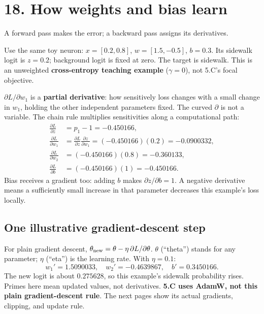 \documentclass[11pt,letterpaper]{article}
\newcommand{\guidepage}[2]{\clearpage\pdfbookmark[0]{#1}{guide-\thepage}\section*{#1}{\sffamily\color{muted}#2}\par\vspace{5pt}}
\begin{document}
\guidepage{18. How weights and bias learn}{A forward pass makes the error; a backward pass assigns its derivatives.}
Use the same toy neuron: $x=[0.2,0.8]$, $w=[1.5,-0.5]$, $b=0.3$. Its sidewalk logit is $z=0.2$; background logit is fixed at zero. The target is sidewalk. This is an unweighted \textbf{cross-entropy teaching example} ($\gamma=0$), not 5.C's focal objective.
\begin{center}
\end{center}
$\partial L/\partial w_1$ is a \textbf{partial derivative}: how sensitively loss changes with a small change in $w_1$, holding the other independent parameters fixed. The curved $\partial$ is not a variable. The chain rule multiplies sensitivities along a computational path:
\begin{align*}
\frac{\partial L}{\partial z}&=p_1-1=-0.450166,\\
\frac{\partial L}{\partial w_1}&=\frac{\partial L}{\partial z}\frac{\partial z}{\partial w_1}
=(-0.450166)(0.2)=-0.0900332,\\
\frac{\partial L}{\partial w_2}&=(-0.450166)(0.8)=-0.360133,\\
\frac{\partial L}{\partial b}&=(-0.450166)(1)=-0.450166.
\end{align*}
Bias receives a gradient too: adding $b$ makes $\partial z/\partial b=1$. A negative derivative means a sufficiently small increase in that parameter decreases this example's loss locally.

\subsection*{One illustrative gradient-descent step}
For plain gradient descent, $\theta_{\rm new}=\theta-\eta\,\partial L/\partial\theta$. $\theta$ (``theta'') stands for any parameter; $\eta$ (``eta'') is the learning rate. With $\eta=0.1$:
\[
w_1'=1.5090033,\quad w_2'=-0.4639867,\quad b'=0.3450166.
\]
The new logit is about $0.275628$, so this example's sidewalk probability rises. Primes here mean updated values, not derivatives. \textbf{5.C uses AdamW, not this plain gradient-descent rule}. The next pages show its actual gradients, clipping, and update rule.
\end{document}
